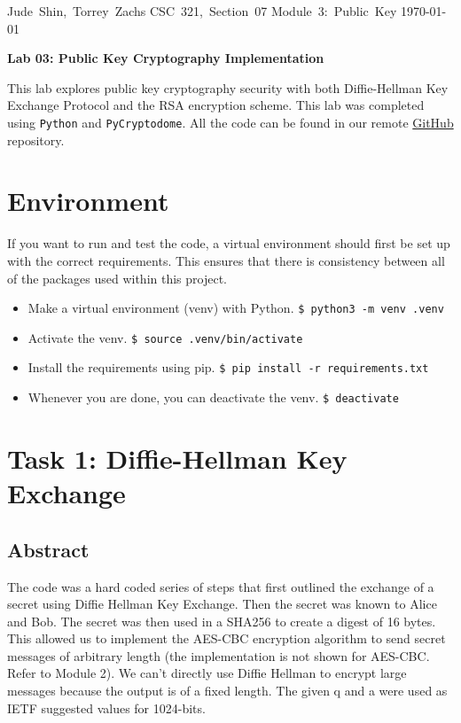 \documentclass[11pt]{article}
\begin{document}
\hfill\vbox{\hbox{Jude Shin, Torrey Zachs}
		\hbox{CSC 321, Section 07}	
		\hbox{Module 3: Public Key}	
		\hbox{\today}}\par

\bigskip
\centerline{\Large\bf Lab 03: Public Key Cryptography Implementation}\par
\bigskip

This lab explores public key cryptography security with both Diffie-Hellman Key Exchange Protocol and the RSA encryption scheme. This lab was completed using {\tt Python} and {\tt PyCryptodome}. All the code can be found in our remote \href{https://github.com/jude-shin/CSC\_321}{GitHub} repository.

\section*{Environment}

If you want to run and test the code, a virtual environment should first be set up with the correct requirements. This ensures that there is consistency between all of the packages used within this project.

\begin{itemize}
	\item Make a virtual environment (venv) with Python.
		\verb|$ python3 -m venv .venv|
	\item Activate the venv.
		\verb|$ source .venv/bin/activate|
	\item Install the requirements using pip.
		\verb|$ pip install -r requirements.txt|
	\item Whenever you are done, you can deactivate the venv.
		\verb|$ deactivate|
\end{itemize}

\section*{Task 1: Diffie-Hellman Key Exchange}

\subsection*{Abstract}

The code was a hard coded series of steps that first outlined the exchange of a secret using Diffie Hellman Key Exchange. Then the secret was known to Alice and Bob. The secret was then used in a SHA256 to create a digest of 16 bytes. This allowed us to implement the AES-CBC encryption algorithm to send secret messages of arbitrary length (the implementation is not shown for AES-CBC. Refer to Module 2). We can’t directly use Diffie Hellman to encrypt large messages because the output is of a fixed length. The given q and a were used as IETF suggested values for 1024-bits.
\end{document}
